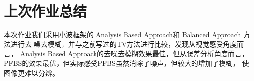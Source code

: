 \documentclass[a4paper,  11pt]{ctexart}
\begin{document}
\section{上次作业总结}
本次作业我们采用小波框架的
Analysis Based Approach和 Balanced Approach 方法进行去
噪去模糊，并与之前写过的TV方法进行比较，发现从视觉感受角度而言，
Analysis Based Approach的去噪去模糊效果最佳，但从误差分析角度而言，
PFBS的效果最优，但实际感受PFBS虽然消除了噪声，但较大的增加了模糊，
使图像更难以分辨。
\end{document}
